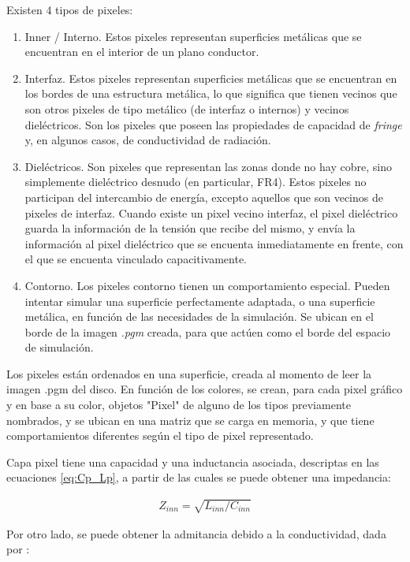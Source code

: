 Existen 4 tipos de pixeles:
\begin{enumerate}
	\item Inner / Interno. Estos pixeles representan superficies metálicas que se encuentran en el interior de un plano conductor.
	\item Interfaz. Estos pixeles representan superficies metálicas que se encuentran en los bordes de una estructura metálica, lo que significa que tienen vecinos que son otros pixeles de tipo metálico (de interfaz o internos) y vecinos dieléctricos. Son los pixeles que poseen las propiedades de capacidad de \textit{fringe} y, en algunos casos, de conductividad de radiación.
	\item Dieléctricos. Son pixeles que representan las zonas donde no hay cobre, sino simplemente dieléctrico desnudo (en particular, FR4). Estos pixeles no participan del intercambio de energía, excepto aquellos que son vecinos de pixeles de interfaz. Cuando existe un pixel vecino interfaz, el pixel dieléctrico guarda la información de la tensión que recibe del mismo, y envía la información al pixel dieléctrico que se encuenta inmediatamente en frente, con el que se encuenta vinculado capacitivamente.
	\item Contorno. Los pixeles contorno tienen un comportamiento especial. Pueden intentar simular una superficie perfectamente adaptada, o una superficie metálica, en función de las necesidades de la simulación. Se ubican en el borde de la imagen \textit{.pgm} creada, para que actúen como el borde del espacio de simulación.
\end{enumerate}

Los pixeles están ordenados en una superficie, creada al momento de leer la imagen .pgm del disco. En función de los colores, se crean, para cada pixel gráfico y en base a su color, objetos "Pixel" de alguno de los tipos previamente nombrados, y se ubican en una matriz que se carga en memoria, y que tiene comportamientos diferentes según el tipo de pixel representado.

Capa pixel tiene una capacidad y una inductancia asociada, descriptas en las ecuaciones \ref{eq:Cp_Lp}, a partir de las cuales se puede obtener una impedancia:

\begin{align}
Z_{inn} = \sqrt{L_{inn} / C_{inn}}
\end{align}

Por otro lado, se puede obtener la admitancia debido a la conductividad, dada por \cite{Saguet}:

